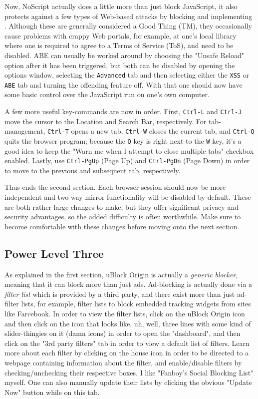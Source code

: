 \documentclass{article}
\begin{document}
Now, NoScript actually does a little more than just block JavaScript, it also protects against a few types of Web-based attacks by blocking  and implementing .  Although these are generally considered a Good Thing (TM), they occasionally cause problems with crappy Web portals, for example, at one's local library where one is required to agree to a Terms of Service (ToS), and need to be disabled.  ABE can usually be worked around by choosing the "Unsafe Reload" option after it has been triggered, but both can be disabled by opening the options window, selecting the \texttt{Advanced} tab and then selecting either the \texttt{XSS} or \texttt{ABE} tab and turning the offending feature off.  With that one should now have some basic control over the JavaScript run on one's own computer.

A few more useful key-commands are now in order.  First, \texttt{Ctrl-L} and \texttt{Ctrl-J} move the cursor to the Location and Search Bar, respectively.  For tab-management, \texttt{Ctrl-T} opens a new tab, \texttt{Ctrl-W} closes the current tab, and \texttt{Ctrl-Q} quits the browser program; because the \texttt{Q} key is right next to the \texttt{W} key, it's a good idea to keep the "Warn me when I attempt to close multiple tabs" checkbox enabled.  Lastly, use \texttt{Ctrl-PgUp} (Page Up) and \texttt{Ctrl-PgDn} (Page Down) in order to move to the previous and subsequent tab, respectively.

Thus ends the second section.  Each browser session should now be more independent and two-way mirror functionality will be disabled by default.  These are both rather large changes to make, but they offer significant privacy and security advantages, so the added difficulty is often worthwhile.  Make sure to become comfortable with these changes before moving onto the next section.

\subsection{Power Level Three}
As explained in the first section, uBlock Origin is actually a \textit{generic blocker}, meaning that it can block more than just ads.  Ad-blocking is actually done via a \textit{filter list} which is provided by a third party, and there exist more than just ad-filter lists, for example, filter lists to block embedded tracking widgets from sites like Farcebook.  In order to view the filter lists, click on the uBlock Origin icon and then click on the icon that looks like, uh, well, three lines with some kind of slider-thingies on it (damn icons) in order to open the "dashboard", and then click on the "3rd party filters" tab in order to view a default list of filters.  Learn more about each filter by clicking on the house icon in order to be directed to a webpage containing information about the filter, and enable/disable filters by checking/unchecking their respective boxes.  I like "Fanboy's Social Blocking List" myself.  One can also manually update their lists by clicking the obvious "Update Now" button while on this tab.
\end{document}
